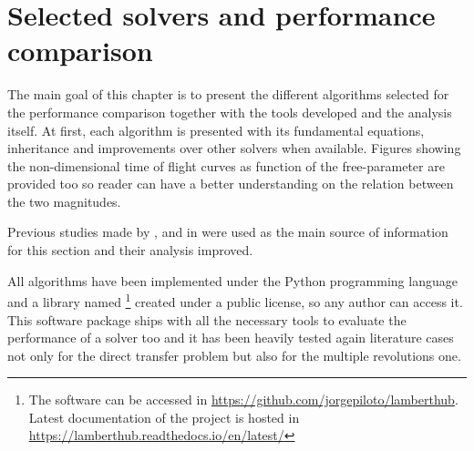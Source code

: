 \chapter{Selected solvers and performance comparison}

The main goal of this chapter is to present the different algorithms selected
for the performance comparison together with the tools developed and the
analysis itself. At first, each algorithm is presented with its
fundamental equations, inheritance and improvements over other solvers
when available. Figures showing the non-dimensional time of flight curves as
function of the free-parameter are provided too so reader can have a better
understanding on the relation between the two magnitudes.

Previous studies made by \cite{klumpp1999}, \cite{torre2015} and in
\cite{martinez2021} were used as the main source of information for this section
and their analysis improved.

All algorithms have been implemented under the Python programming language and a
library named \footnote{The software can be accessed
  in
  \href{https://github.com/jorgepiloto/lamberthub}{https://github.com/jorgepiloto/lamberthub}.
  Latest documentation of the project is hosted in
  \href{https://lamberthub.readthedocs.io/en/latest/}{https://lamberthub.readthedocs.io/en/latest/}}
created under a public license, so any author can access it. This software
package ships with all the necessary tools to evaluate the performance of a
solver too and it has been heavily tested again literature cases not only for
the direct transfer problem but also for the multiple revolutions one.




